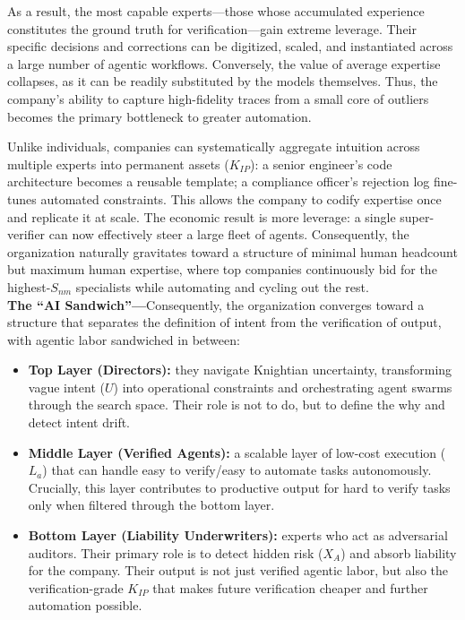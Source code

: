 \documentclass[12pt, letter]{article}
\begin{document}
As a result, the most capable experts—those whose accumulated experience constitutes the ground truth for verification—gain extreme leverage. Their specific decisions and corrections can be digitized, scaled, and instantiated across a large number of agentic workflows. Conversely, the value of average expertise collapses, as it can be readily substituted by the models themselves. Thus, the company’s ability to capture high-fidelity traces from a small core of outliers becomes the primary bottleneck to greater automation.

Unlike individuals, companies can systematically aggregate intuition across multiple experts into permanent assets ($K_{IP}$): a senior engineer's code architecture becomes a reusable template; a compliance officer's rejection log fine-tunes automated constraints. This allows the company to codify expertise once and replicate it at scale. The economic result is more leverage: a single super-verifier can now effectively steer a large fleet of agents. Consequently, the organization naturally gravitates toward a structure of minimal human headcount but maximum human expertise, where top companies continuously bid for the highest-$S_{nm}$ specialists while automating and cycling out the rest. \\

\textbf{The ``AI Sandwich''—}Consequently, the organization converges toward a structure that separates the definition of intent from the verification of output, with agentic labor sandwiched in between:

\begin{itemize}

\item \textbf{Top Layer (Directors):} they navigate Knightian uncertainty, transforming vague intent ($U$) into operational constraints and orchestrating agent swarms through the search space. Their role is not to do, but to define the why and detect intent drift.

\item \textbf{Middle Layer (Verified Agents):} a scalable layer of low-cost execution ($L_a$) that can handle easy to verify/easy to automate tasks autonomously. Crucially, this layer contributes to productive output for hard to verify tasks only when filtered through the bottom layer.

\item \textbf{Bottom Layer (Liability Underwriters):} experts who act as adversarial auditors. Their primary role is to detect hidden risk ($X_A$) and absorb liability for the company. Their output is not just verified agentic labor, but also the verification-grade $K_{IP}$ that makes future verification cheaper and further automation possible. 

\end{itemize}
\end{document}

